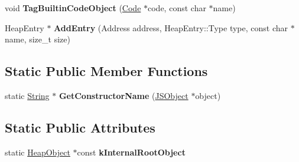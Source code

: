 \begin{DoxyCompactItemize}
\item 
\hypertarget{classv8_1_1internal_1_1_v8_heap_explorer_ad3d4c6c7b58608611364dd2d926e335e}{}void {\bfseries Tag\+Builtin\+Code\+Object} (\hyperlink{classv8_1_1internal_1_1_code}{Code} $\ast$code, const char $\ast$name)\label{classv8_1_1internal_1_1_v8_heap_explorer_ad3d4c6c7b58608611364dd2d926e335e}

\item 
\hypertarget{classv8_1_1internal_1_1_v8_heap_explorer_abd278633cdd9c46c73e0455558f16068}{}Heap\+Entry $\ast$ {\bfseries Add\+Entry} (Address address, Heap\+Entry\+::\+Type type, const char $\ast$name, size\+\_\+t size)\label{classv8_1_1internal_1_1_v8_heap_explorer_abd278633cdd9c46c73e0455558f16068}

\end{DoxyCompactItemize}
\subsection*{Static Public Member Functions}
\begin{DoxyCompactItemize}
\item 
\hypertarget{classv8_1_1internal_1_1_v8_heap_explorer_a6d153afbe0111362b4333c3eed73d9c1}{}static \hyperlink{classv8_1_1internal_1_1_string}{String} $\ast$ {\bfseries Get\+Constructor\+Name} (\hyperlink{classv8_1_1internal_1_1_j_s_object}{J\+S\+Object} $\ast$object)\label{classv8_1_1internal_1_1_v8_heap_explorer_a6d153afbe0111362b4333c3eed73d9c1}

\end{DoxyCompactItemize}
\subsection*{Static Public Attributes}
\begin{DoxyCompactItemize}
\item 
static \hyperlink{classv8_1_1internal_1_1_heap_object}{Heap\+Object} $\ast$const {\bfseries k\+Internal\+Root\+Object}
\end{DoxyCompactItemize}

